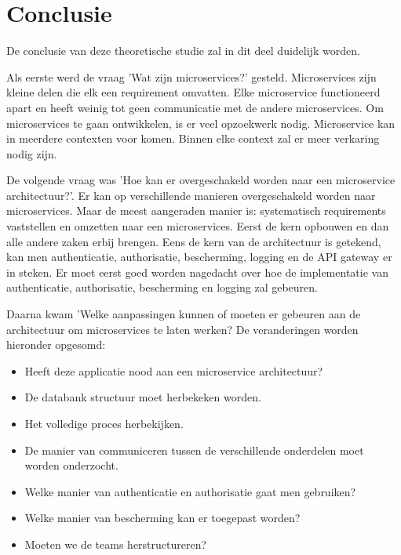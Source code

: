 
\chapter{Conclusie}
\label{ch:conclusie}


De conclusie van deze theoretische studie zal in dit deel duidelijk worden.

Als eerste werd de vraag 'Wat zijn microservices?' gesteld. 
Microservices zijn kleine delen die elk een requirement omvatten. Elke microservice functioneerd apart en heeft weinig tot geen communicatie met de andere microservices. Om microservices te gaan ontwikkelen, is er veel opzoekwerk nodig. Microservice kan in meerdere contexten voor komen. Binnen elke context zal er meer verkaring nodig zijn.

De volgende vraag was 'Hoe kan er overgeschakeld worden naar een microservice architectuur?'.
Er kan op verschillende manieren overgeschakeld worden naar microservices. Maar de meest aangeraden manier is: systematisch requirements vaststellen en omzetten naar een microservices. Eerst de kern opbouwen en dan alle andere zaken erbij brengen. Eens de kern van de architectuur is getekend, kan men authenticatie, authorisatie, bescherming, logging en de API gateway er in steken. Er moet eerst goed worden nagedacht over hoe de implementatie van authenticatie, authorisatie, bescherming en logging zal gebeuren.

Daarna kwam 'Welke aanpassingen kunnen of moeten er gebeuren aan de architectuur om microservices te laten werken? De veranderingen worden hieronder opgesomd:
\begin{itemize}
	\item Heeft deze applicatie nood aan een microservice architectuur?
	\item De databank structuur moet herbekeken worden.
	\item Het volledige proces herbekijken.
	\item De manier van communiceren tussen de verschillende onderdelen moet worden onderzocht.
	\item Welke manier van authenticatie en authorisatie gaat men gebruiken?
	\item Welke manier van bescherming kan er toegepast worden?
	\item Moeten we de teams herstructureren?
\end{itemize}

